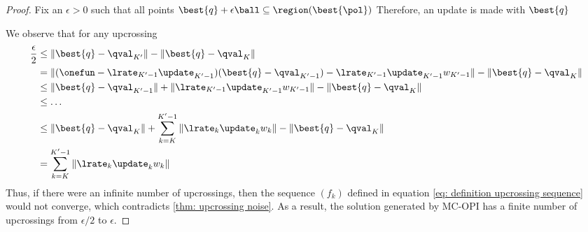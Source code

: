 \begin{proof}
Fix an $\epsilon > 0$ 
such that all points $\best{q} + \epsilon \ball \subseteq \region(\best{\pol})$
Therefore, an update is made with $\best{q}$

We observe that for any upcrossing
\begin{align*}
    \dfrac{\epsilon}{2}
    &\leq \| \best{q} - \qval_{K'} \| 
    - \| \best{q} - \qval_{K} \|
    \\
    &= \| (\onefun - \lrate_{K' - 1} \update_{K' - 1}) (\best{q} - \qval_{K' - 1}) - \lrate_{K' - 1} \update_{K' - 1} w_{K' - 1} \| 
    - \| \best{q} - \qval_{K} \|
    \\
    &\leq \| \best{q} - \qval_{K' - 1} \| + \| \lrate_{K' - 1} \update_{K' - 1} w_{K' - 1} \| 
    - \| \best{q} - \qval_{K} \|
    \\
    &\leq \dots
    \\
    &\leq \| \best{q} - \qval_{K} \| + \sum_{k=K}^{K'-1} \| \lrate_{k} \update_{k} w_{k} \| 
    - \| \best{q} - \qval_{K} \|
    \\
    &= \sum_{k=K}^{K'-1} \| \lrate_{k} \update_{k} w_{k} \|
\end{align*}
Thus, if there were an infinite number of upcrossings, then the sequence $(f_k)$ defined in equation \eqref{eq: definition upcrossing sequence} would not converge, which contradicts \autoref{thm: upcrossing noise}.
As a result, the solution generated by MC-OPI has a finite number of upcrossings from $\epsilon/2$ to $\epsilon$.




\end{proof}
